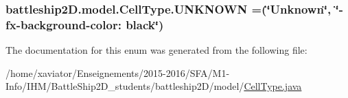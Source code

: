 \hypertarget{enumbattleship2D_1_1model_1_1CellType_a8d4deb923c1df4cd4148f298e4adfdfb}{
\subsubsection[{U\-N\-K\-N\-O\-W\-N}]{\setlength{\rightskip}{0pt plus 5cm}battleship2\-D.\-model.\-Cell\-Type.\-U\-N\-K\-N\-O\-W\-N =(\char`\"{}Unknown\char`\"{}, \char`\"{}-\/fx-\/background-\/color\-: black\char`\"{})}}\label{enumbattleship2D_1_1model_1_1CellType_a8d4deb923c1df4cd4148f298e4adfdfb}


The documentation for this enum was generated from the following file\-:\begin{DoxyCompactItemize}
\item 
/home/xaviator/\-Enseignements/2015-\/2016/\-S\-F\-A/\-M1-\/\-Info/\-I\-H\-M/\-Battle\-Ship2\-D\-\_\-students/battleship2\-D/model/\hyperlink{CellType_8java}{Cell\-Type.\-java}\end{DoxyCompactItemize}
